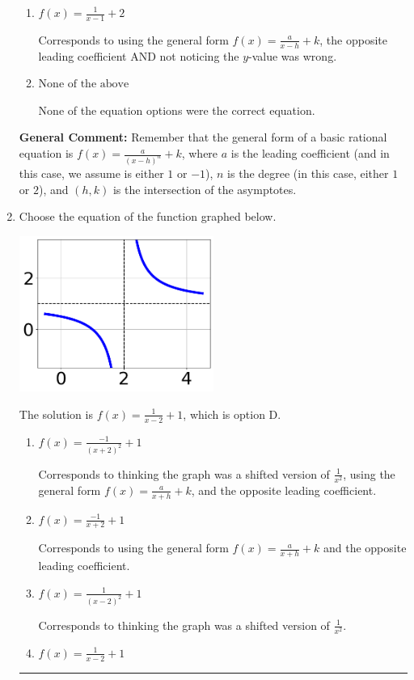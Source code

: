 \documentclass{extbook}[14pt]
\newcommand{\litem}[1]{\item #1

\rule{\textwidth}{0.4pt}}
\begin{document}
\begin{enumerate}
{\begin{enumerate}[label=\Alph*.]
The $x$- and $y$-value of the equation does not match the graph.
\item \( f(x) = \frac{1}{x - 1} + 2 \)

Corresponds to using the general form $f(x) = \frac{a}{x-h}+k$, the opposite leading coefficient AND not noticing the $y$-value was wrong.
\item \( \text{None of the above} \)

None of the equation options were the correct equation.
\end{enumerate}

\textbf{General Comment:} Remember that the general form of a basic rational equation is $ f(x) = \frac{a}{(x-h)^n} + k$, where $a$ is the leading coefficient (and in this case, we assume is either $1$ or $-1$), $n$ is the degree (in this case, either $1$ or $2$), and $(h, k)$ is the intersection of the asymptotes.
}
\litem{
Choose the equation of the function graphed below.

\begin{center}
    \includegraphics[width=0.5\textwidth]{../Figures/rationalGraphToEquationCopyB.png}
\end{center}


The solution is \( f(x) = \frac{1}{x - 2} + 1 \), which is option D.\begin{enumerate}[label=\Alph*.]
\item \( f(x) = \frac{-1}{(x + 2)^2} + 1 \)

Corresponds to thinking the graph was a shifted version of $\frac{1}{x^2}$, using the general form $f(x) = \frac{a}{x+h}+k$, and the opposite leading coefficient.
\item \( f(x) = \frac{-1}{x + 2} + 1 \)

Corresponds to using the general form $f(x) = \frac{a}{x+h}+k$ and the opposite leading coefficient.
\item \( f(x) = \frac{1}{(x - 2)^2} + 1 \)

Corresponds to thinking the graph was a shifted version of $\frac{1}{x^2}$.
\item \( f(x) = \frac{1}{x - 2} + 1 \)


\end{enumerate}}
\end{enumerate}
\end{document}
